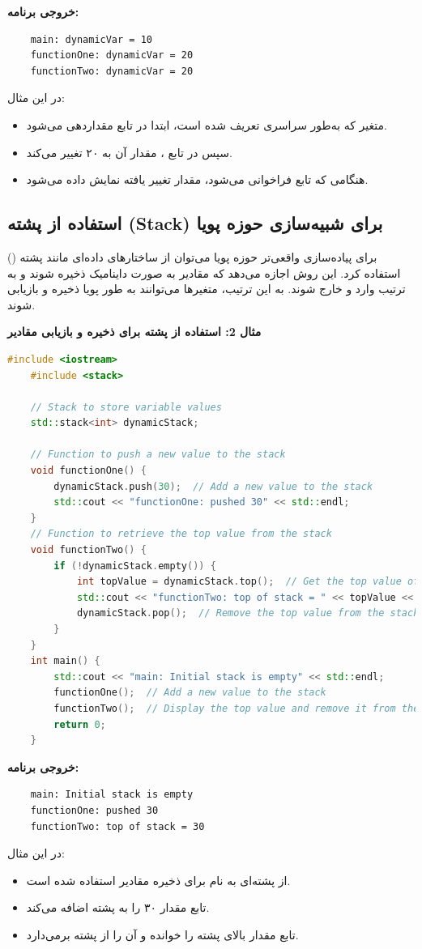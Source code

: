 \documentclass[12pt, a4paper]{report}
\begin{document}
\textbf{خروجی برنامه:}
\LTR
\begin{verbatim}
	main: dynamicVar = 10
	functionOne: dynamicVar = 20
	functionTwo: dynamicVar = 20
\end{verbatim}
\RTL
در این مثال:
\begin{itemize}
	\item متغیر  که به‌طور سراسری تعریف شده است، ابتدا در تابع  مقداردهی می‌شود.
	\item سپس در تابع ، مقدار آن به ۲۰ تغییر می‌کند.
	\item هنگامی که تابع  فراخوانی می‌شود، مقدار تغییر یافته  نمایش داده می‌شود.
\end{itemize}
\subsection{استفاده از پشته (Stack) برای شبیه‌سازی حوزه پویا}
برای پیاده‌سازی واقعی‌تر حوزه پویا می‌توان از ساختارهای داده‌ای مانند پشته () استفاده کرد. این روش اجازه می‌دهد که مقادیر به صورت داینامیک ذخیره شوند و به ترتیب وارد و خارج شوند. به این ترتیب، متغیرها می‌توانند به طور پویا ذخیره و بازیابی شوند.

\textbf{مثال 2: استفاده از پشته برای ذخیره و بازیابی مقادیر}
\LTR
\begin{lstlisting}[language=C++,  breaklines=true]
	#include <iostream>
	#include <stack>
	
	// Stack to store variable values
	std::stack<int> dynamicStack;
	
	// Function to push a new value to the stack
	void functionOne() {
		dynamicStack.push(30);  // Add a new value to the stack
		std::cout << "functionOne: pushed 30" << std::endl;
	}
	// Function to retrieve the top value from the stack
	void functionTwo() {
		if (!dynamicStack.empty()) {
			int topValue = dynamicStack.top();  // Get the top value of the stack
			std::cout << "functionTwo: top of stack = " << topValue << std::endl;
			dynamicStack.pop();  // Remove the top value from the stack
		}
	}
	int main() {
		std::cout << "main: Initial stack is empty" << std::endl;
		functionOne();  // Add a new value to the stack
		functionTwo();  // Display the top value and remove it from the stack
		return 0;
	}
\end{lstlisting}
\RTL
\textbf{خروجی برنامه:}
\LTR
\begin{verbatim}
	main: Initial stack is empty
	functionOne: pushed 30
	functionTwo: top of stack = 30
\end{verbatim}
\RTL
در این مثال:
\begin{itemize}
	\item از پشته‌ای به نام  برای ذخیره مقادیر استفاده شده است.
	\item تابع  مقدار ۳۰ را به پشته اضافه می‌کند.
	\item تابع  مقدار بالای پشته را خوانده و آن را از پشته برمی‌دارد.
\end{itemize}
\end{document}
